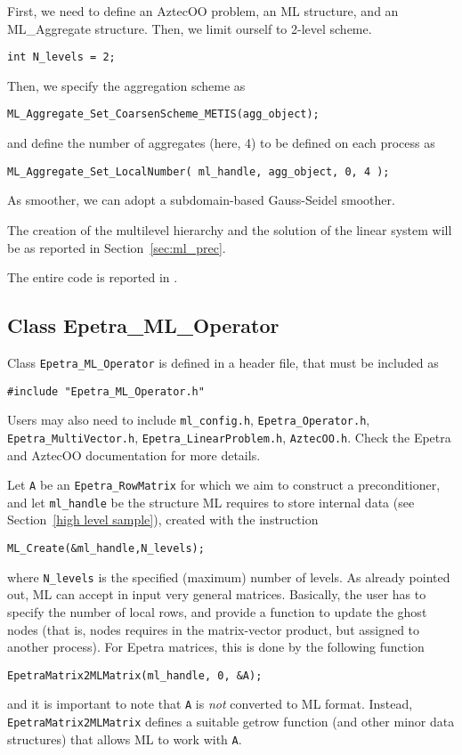 First, we need to define an AztecOO problem, an ML structure, and an
ML\_Aggregate structure. Then, we limit ourself to 2-level scheme.
\begin{verbatim}
int N_levels = 2;
\end{verbatim}
Then, we specify the aggregation scheme as
\begin{verbatim}
ML_Aggregate_Set_CoarsenScheme_METIS(agg_object);
\end{verbatim}
and define the number of aggregates (here, 4) to be defined on each
process as
\begin{verbatim}
ML_Aggregate_Set_LocalNumber( ml_handle, agg_object, 0, 4 );
\end{verbatim}

As smoother, we can adopt a subdomain-based Gauss-Seidel smoother.

The creation of the multilevel hierarchy and the solution of the linear
system will be as reported in Section~\ref{sec:ml_prec}.

The entire code is reported in .


\subsection{Class Epetra\_ML\_Operator}
\label{ML_Operator}

Class \verb!Epetra_ML_Operator! is defined in a header file, that must
be included as
\begin{verbatim}
#include "Epetra_ML_Operator.h" 
\end{verbatim}
Users may also need to include \verb!ml_config.h!,
\verb!Epetra_Operator.h!, \verb!Epetra_MultiVector.h!,
\verb!Epetra_LinearProblem.h!,  \verb!AztecOO.h!. Check the Epetra and
AztecOO documentation for more details.

Let \verb!A! be an \verb!Epetra_RowMatrix! for which we aim to construct
a preconditioner, and let \verb!ml_handle! be the structure ML requires
to store internal data (see Section~\ref{high level sample}), created
with the instruction
\begin{verbatim}
ML_Create(&ml_handle,N_levels);
\end{verbatim}
where \verb!N_levels! is the specified (maximum) number of levels.  As
already pointed out, ML can accept in input very general matrices.
Basically, the user has to specify the number of local rows, and provide
a function to update the ghost nodes (that is, nodes requires in the
matrix-vector product, but assigned to another process). For Epetra
matrices, this is done by the following function
\begin{verbatim}
EpetraMatrix2MLMatrix(ml_handle, 0, &A);
\end{verbatim}
and it is important to note that \verb!A! is {\sl not} converted to ML
format. Instead, \verb!EpetraMatrix2MLMatrix! defines a suitable getrow
function (and other minor data structures) that allows ML to work with
\verb!A!.

